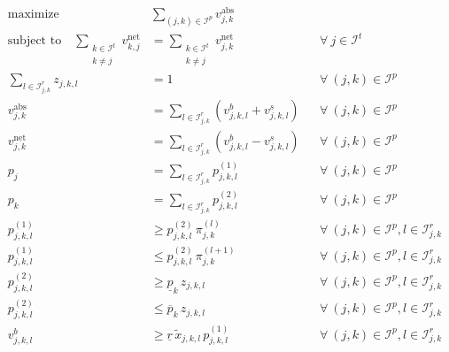 \documentclass[11pt,parskip=full]{scrartcl}%
\newcommand*{\itokens}{\mathcal{I}^t}       %
\newcommand*{\itokenpairs}{\mathcal{I}^p}   %
\begin{document}
\begin{small}
\begin{subequations}
\begin{align}
  \text{maximize} \quad & \sum\limits_{(j,k) \in \itokenpairs} v_{j,k}^\mathrm{abs}
  \label{eq:mip2_objective}
  \\[2mm]
  \text{subject to} \quad
  \sum_{\substack{k \in \itokens \\ k \neq j}} v_{k,j}^\mathrm{net}
  &= \sum_{\substack{k \in \itokens \\ k \neq j}} v_{j,k}^\mathrm{net}
  && \forall \> j \in \itokens
  \label{eq:mip2_tokenbalance}
  \\[1mm]
  \sum\limits_{l \in \mathcal{I}_{j,k}^r} z_{j,k,l} &= 1
  && \forall \> (j,k) \in \itokenpairs
  \label{eq:mip2_price_range}
  \\[1mm]
  v_{j,k}^\mathrm{abs}
  &= \sum\limits_{l {}\in \mathcal{I}_{j,k}^r} \left( v^b_{j,k,l} + v^s_{j,k,l} \right)
  && \forall \> (j,k) \in \itokenpairs
  \label{eq:mip2_volume_aggr_abs}
  \\[1mm]
  v_{j,k}^\mathrm{net}
  &= \sum\limits_{l \in \mathcal{I}_{j,k}^r} \left( v^b_{j,k,l} - v^s_{j,k,l} \right)
  && \forall \> (j,k) \in \itokenpairs
  \label{eq:mip2_volume_aggr_net}
  \\[1mm]
  p_j
  &= \sum\limits_{l \in \mathcal{I}_{j,k}^r} p^{(1)}_{j,k,l}
  && \forall \> (j,k) \in \itokenpairs
  \label{eq:mip2_price1_aggr}
  \\[1mm]
  p_k
  &= \sum\limits_{l \in \mathcal{I}_{j,k}^r} p^{(2)}_{j,k,l}
  && \forall \> (j,k) \in \itokenpairs
  \label{eq:mip2_price2_aggr}
  \\[1mm]
  p^{(1)}_{j,k,l}
  &\ge p^{(2)}_{j,k,l} \, \pi_{j,k}^{(l)}
  && \forall \> (j,k) \in \itokenpairs, l \in \mathcal{I}_{j,k}^r
  \label{eq:mip2_price1_lb}
  \\[0mm]
  p^{(1)}_{j,k,l}
  &\le p^{(2)}_{j,k,l} \, \pi_{j,k}^{(l+1)}
  && \forall \> (j,k) \in \itokenpairs, l \in \mathcal{I}_{j,k}^r
  \label{eq:mip2_price1_ub}
  \\[0mm]
  p^{(2)}_{j,k,l}
  &\ge \underline{p}_k \, z_{j,k,l}
  && \forall \> (j,k) \in \itokenpairs, l \in \mathcal{I}_{j,k}^r
  \label{eq:mip2_price2_lb}
  \\[0mm]
  p^{(2)}_{j,k,l}
  &\le \overline{p}_k \, z_{j,k,l}
  && \forall \> (j,k) \in \itokenpairs, l \in \mathcal{I}_{j,k}^r
  \label{eq:mip2_price2_ub}
  \\[1mm]
  v^b_{j,k,l}
  &\ge \underline{r} \, \tilde{x}_{j,k,l} \, p^{(1)}_{j,k,l}
  && \forall \> (j,k) \in \itokenpairs, l \in \mathcal{I}_{j,k}^r

\end{align}
\end{subequations}
\end{small}
\end{document}
